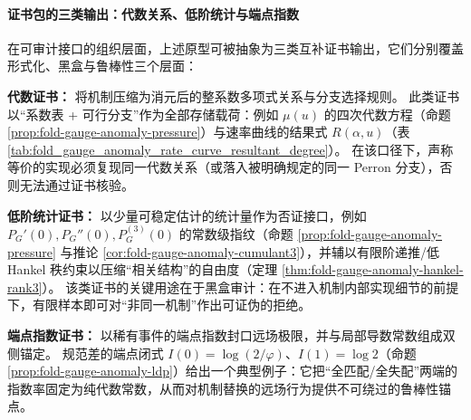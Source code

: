 \paragraph{证书包的三类输出：代数关系、低阶统计与端点指数}
在可审计接口的组织层面，上述原型可被抽象为三类互补证书输出，它们分别覆盖形式化、黑盒与鲁棒性三个层面：
\par
\textbf{代数证书：}
将机制压缩为消元后的整系数多项式关系与分支选择规则。
此类证书以“系数表 + 可行分支”作为全部存储载荷：例如 \(\mu(u)\) 的四次代数方程（命题 \ref{prop:fold-gauge-anomaly-pressure}）与速率曲线的结果式 \(R(\alpha,u)\)（表 \ref{tab:fold_gauge_anomaly_rate_curve_resultant_degree}）。
在该口径下，声称等价的实现必须复现同一代数关系（或落入被明确规定的同一 Perron 分支），否则无法通过证书核验。
\par
\textbf{低阶统计证书：}
以少量可稳定估计的统计量作为否证接口，例如 \(P_G'(0),P_G''(0),P_G^{(3)}(0)\) 的常数级指纹（命题 \ref{prop:fold-gauge-anomaly-pressure} 与推论 \ref{cor:fold-gauge-anomaly-cumulant3}），并辅以有限阶递推/低 Hankel 秩约束以压缩“相关结构”的自由度（定理 \ref{thm:fold-gauge-anomaly-hankel-rank3}）。
该类证书的关键用途在于黑盒审计：在不进入机制内部实现细节的前提下，有限样本即可对“非同一机制”作出可证伪的拒绝。
\par
\textbf{端点指数证书：}
以稀有事件的端点指数封口远场极限，并与局部导数常数组成双侧锚定。
规范差的端点闭式 \(I(0)=\log(2/\varphi)\)、\(I(1)=\log 2\)（命题 \ref{prop:fold-gauge-anomaly-ldp}）给出一个典型例子：它把“全匹配/全失配”两端的指数率固定为纯代数常数，从而对机制替换的远场行为提供不可绕过的鲁棒性锚点。

